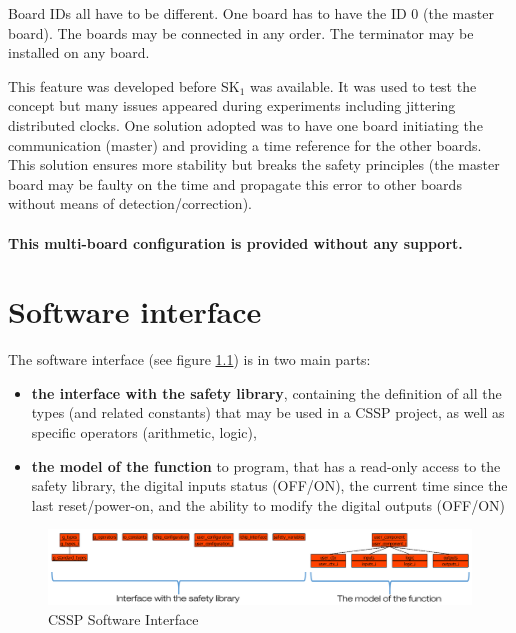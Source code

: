 Board IDs all have to be different. One board has to have the ID 0 (the master board). The boards may be connected in any order. The terminator may be installed on any board.

This feature was developed before SK$_1$ was available. It was used to test the concept but many issues appeared during experiments including jittering distributed clocks. One solution adopted was to have one board initiating the communication (master) and providing a time reference for the other boards. This solution ensures more stability but breaks the safety principles (the master board may be faulty on the time and propagate this error to other boards without means of detection/correction). \\\\
\textbf{\color{ocre}This multi-board configuration is provided without any support.} 



\chapter{Software interface}

The software interface (see figure \ref{annexes:CSSP-SW-interface}) is in two main parts:
\begin{itemize}
    \item \textbf{the interface with the safety library}, containing the definition of all the types (and related constants) that may be used in a CSSP project, as well as specific operators (arithmetic, logic),
    \item \textbf{the model of the function} to program, that has a read-only access to the safety library, the digital inputs status (OFF/ON), the current time since the last reset/power-on, and the ability to modify the digital outputs (OFF/ON)
\end{itemize}
\begin{figure}[h]
\centering\includegraphics[scale=0.25]{Pictures/chapterAnnexes/sw-interface.png}
\caption{CSSP Software Interface}
\label{annexes:CSSP-SW-interface}
\end{figure}

